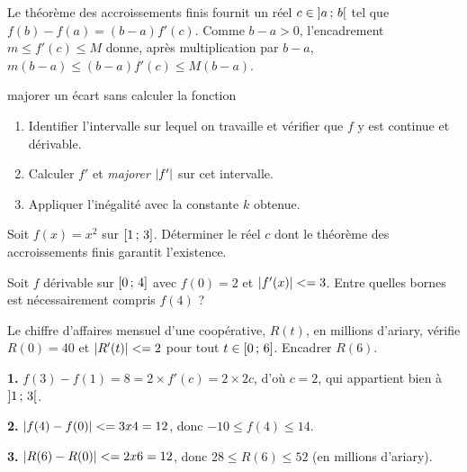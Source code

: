 \begin{demonstration}
Le théorème des accroissements finis fournit un réel
$c \in \left]a\,;\,b\right[$ tel que $f(b)-f(a) = (b-a)f'(c)$. Comme
$b-a > 0$, l'encadrement $m \leq f'(c) \leq M$ donne, après multiplication par
$b-a$, $m(b-a) \leq (b-a)f'(c) \leq M(b-a)$.
\end{demonstration}

\begin{methode}{majorer un écart sans calculer la fonction}
\begin{enumerate}[label=\textbf{\arabic*.}, leftmargin=*, itemsep=0.3em]
  \item Identifier l'intervalle sur lequel on travaille et vérifier que $f$ y
        est continue et dérivable.
  \item Calculer $f'$ et \emph{majorer $\left|f'\right|$} sur cet intervalle.
  \item Appliquer l'inégalité avec la constante $k$ obtenue.
\end{enumerate}
\end{methode}

\begin{entrainement}
\exo[\niveau{1}] Soit $f(x) = x^{2}$ sur $\left[1\,;\,3\right]$. Déterminer le
réel $c$ dont le théorème des accroissements finis garantit l'existence.

\exo[\niveau{2}] Soit $f$ dérivable sur $\left[0\,;\,4\right]$ avec $f(0) = 2$ et
$\left|f'(x)\right| <= 3$. Entre quelles bornes est nécessairement compris $f(4)$ ?

\exo[\niveau{3}] Le chiffre d'affaires mensuel d'une coopérative, $R(t)$, en
millions d'ariary, vérifie $R(0) = 40$ et $\left|R'(t)\right| <= 2$ pour tout
$t \in \left[0\,;\,6\right]$. Encadrer $R(6)$.
\end{entrainement}

\begin{corrige}
\textbf{1.} $f(3)-f(1) = 8 = 2 \times f'(c) = 2 \times 2c$, d'où $c = 2$, qui
appartient bien à $\left]1\,;\,3\right[$.

\textbf{2.} $\left|f(4)-f(0)\right| <= 3 x 4 = 12$, donc
$-10 \leq f(4) \leq 14$.

\textbf{3.} $\left|R(6)-R(0)\right| <= 2 x 6 = 12$, donc
$28 \leq R(6) \leq 52$ (en millions d'ariary).
\end{corrige}


